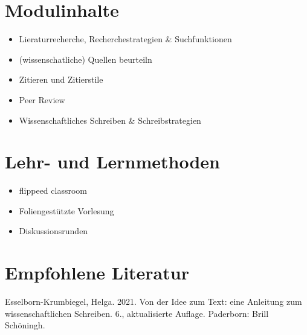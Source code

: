 \hypertarget{modulinhaltepathlabel....srcmodulbeschreibungen-bachelor-bpo5ba_advanced-seminar}{%
\section*{Modulinhalte\label{../../src/modulbeschreibungen-bachelor-bpo5/BA_Advanced-Seminar}}\label{modulinhaltepathlabel....srcmodulbeschreibungen-bachelor-bpo5ba_advanced-seminar}}

\begin{itemize}
\tightlist
\item
  Lieraturrecherche, Recherchestrategien \& Suchfunktionen
\item
  (wissenschatliche) Quellen beurteiln
\item
  Zitieren und Zitierstile
\item
  Peer Review
\item
  Wissenschaftliches Schreiben \& Schreibstrategien
\end{itemize}

\hypertarget{lehr--und-lernmethodenpathlabel....srcmodulbeschreibungen-bachelor-bpo5ba_advanced-seminar}{%
\section*{Lehr- und
Lernmethoden\label{../../src/modulbeschreibungen-bachelor-bpo5/BA_Advanced-Seminar}}\label{lehr--und-lernmethodenpathlabel....srcmodulbeschreibungen-bachelor-bpo5ba_advanced-seminar}}

\begin{itemize}
\tightlist
\item
  flippeed classroom
\item
  Foliengestützte Vorlesung
\item
  Diskussionsrunden
\end{itemize}

\hypertarget{empfohlene-literaturpathlabel....srcmodulbeschreibungen-bachelor-bpo5ba_advanced-seminar}{%
\section*{Empfohlene
Literatur\label{../../src/modulbeschreibungen-bachelor-bpo5/BA_Advanced-Seminar}}\label{empfohlene-literaturpathlabel....srcmodulbeschreibungen-bachelor-bpo5ba_advanced-seminar}}

Esselborn-Krumbiegel, Helga. 2021. Von der Idee zum Text: eine Anleitung
zum wissenschaftlichen Schreiben. 6., aktualisierte Auflage. Paderborn:
Brill Schöningh.

